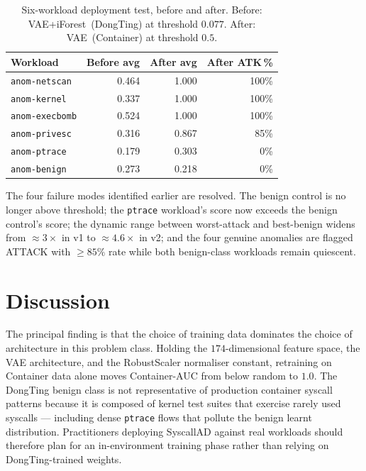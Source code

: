 \begin{table}[!t]
\centering
\caption{Six-workload deployment test, before and after.
Before: VAE+iForest~(DongTing) at threshold $0.077$.
After: VAE~(Container) at threshold $0.5$.}
\label{tab:v2_multipod}
\begin{tabular}{lrrr}
\toprule
Workload              & Before avg & After avg & After ATK\,\% \\
\midrule
\texttt{anom-netscan}   & 0.464 & 1.000 & 100\% \\
\texttt{anom-kernel}    & 0.337 & 1.000 & 100\% \\
\texttt{anom-execbomb}  & 0.524 & 1.000 & 100\% \\
\texttt{anom-privesc}   & 0.316 & 0.867 & 85\%  \\
\texttt{anom-ptrace}    & 0.179 & 0.303 & 0\%   \\
\texttt{anom-benign}    & 0.273 & 0.218 & 0\%   \\
\bottomrule
\end{tabular}
\end{table}

The four failure modes identified earlier are resolved.
The benign control is no longer above threshold; the
\texttt{ptrace} workload's score now exceeds the benign control's
score; the dynamic range between worst-attack and best-benign widens
from $\approx\!3\times$ in v1 to $\approx\!4.6\times$ in v2; and the
four genuine anomalies are flagged ATTACK with $\ge\!85\%$ rate while
both benign-class workloads remain quiescent.

\FloatBarrier
\section{Discussion}
\label{sec:discussion}

The principal finding is that the choice of training data dominates
the choice of architecture in this problem class. Holding the
$174$-dimensional feature space, the VAE architecture, and the
RobustScaler normaliser constant, retraining on Container data
alone moves Container-AUC from below random to $1.0$. The
DongTing benign class is not representative of production container
syscall patterns because it is composed of kernel test suites that
exercise rarely used syscalls --- including dense \texttt{ptrace}
flows that pollute the benign learnt distribution. Practitioners
deploying SyscallAD against real workloads should therefore plan
for an in-environment training phase rather than relying on
DongTing-trained weights.

